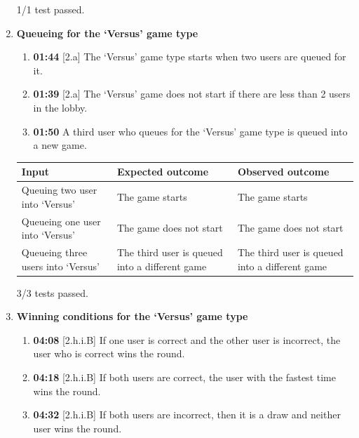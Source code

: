 \documentclass{article}
\begin{document}
\begin{enumerate}
    1/1 test passed. \\
    
    \item \textbf{Queueing for the `Versus' game type}
    
    \begin{enumerate}
        \item \textbf{01:44} [2.a] The `Versus' game type starts when two users are queued for it.
        \item \textbf{01:39} [2.a] The `Versus' game does not start if there are less than 2 users in the lobby.
        \item \textbf{01:50} A third user who queues for the `Versus' game type is queued into a new game.
    \end{enumerate}

    \begin{table}[H]
    \centering
        \begin{tabularx}{\textwidth}{|L|L|L|}
        \hline
        \textbf{Input} & \textbf{Expected outcome} & \textbf{Observed outcome} \\\hline
        Queuing two user into `Versus' & The game starts & The game starts \\\hline
        Queueing one user into `Versus' & The game does not start & The game does not start \\\hline
        Queueing three users into `Versus' & The third user is queued into a different game & The third user is queued into a different game \\\hline
        \end{tabularx}
    \end{table}

    3/3 tests passed. \\

    \item \textbf{Winning conditions for the `Versus' game type}
    
    \begin{enumerate}
        \item \textbf{04:08} [2.h.i.B] If one user is correct and the other user is incorrect, the user who is correct wins the round.
        \item \textbf{04:18} [2.h.i.B] If both users are correct, the user with the fastest time wins the round.
        \item \textbf{04:32} [2.h.i.B] If both users are incorrect, then it is a draw and neither user wins the round. 
    \end{enumerate}


\end{enumerate}
\end{document}
